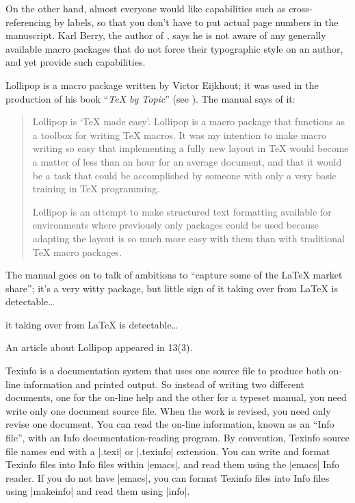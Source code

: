On the other hand, almost everyone would like capabilities such as
cross-referencing by labels, so that you don't have to put actual page
numbers in the manuscript.  Karl Berry, the author of \Eplain{}, says
he is not aware of any generally available macro packages that do
not force their typographic style on an author, and yet provide
such capabilities.


Lollipop is a macro package written by Victor Eijkhout; it was used in
the production of his book ``\emph{\TeX{} by Topic}'' (see
).  The manual says of
it:
\begin{quote}
  Lollipop is `\TeX{} made easy'. Lollipop is a macro package that
  functions as a toolbox for writing \TeX{} macros.  It was my
  intention to make macro writing so easy that implementing a fully
  new layout in \TeX{} would become a matter of less than an hour for
  an average document, and that it would be a task that could be
  accomplished by someone with only a very basic training in \TeX{}
  programming.

  Lollipop is an attempt to make structured text formatting available
  for environments where previously only \WYSIWYG{} packages could be
  used because adapting the layout is so much more easy with them than
  with traditional \TeX{} macro packages.
\end{quote}

The manual goes on to talk of ambitions to ``capture some of the
\LaTeX{} market share''; it's a very witty package, but little sign of
\htmlignore
it taking over from \LaTeX{} is detectable\dots\@
\endhtmlignore
\begin{htmlversion}
it taking over from \LaTeX{} is detectable\dots{}
\end{htmlversion}
An article about Lollipop appeared in \TUGboat{} 13(3).


Texinfo is a documentation system that uses one source file to
produce both on-line information and printed output.  So
instead of writing two different documents, one for the on-line help
and the other for a typeset manual, you need write only one
document source file.  When the work
is revised, you need only revise one document.  You can read the
on-line information, known as an ``Info file'', with an Info
documentation-reading program.  By convention, Texinfo source file
names end with a |.texi| or |.texinfo| extension.
You can write and format Texinfo files into Info files within 
\ProgName|emacs|, and read them using the \ProgName|emacs| Info
reader.  If you do not have \ProgName|emacs|, you can format Texinfo
files into Info files using \ProgName|makeinfo| and read them using
\ProgName|info|.


